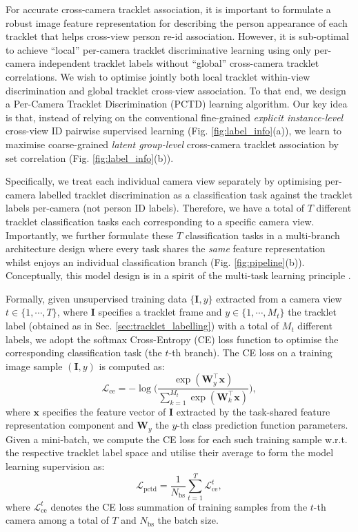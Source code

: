 \documentclass[runningheads]{llncs}
\begin{document}
For accurate cross-camera tracklet association, 
it is important to formulate a robust image feature representation for
describing the person appearance of each tracklet
that helps cross-view 
person re-id association.
However, it is sub-optimal to achieve ``local'' per-camera tracklet
discriminative learning using only per-camera independent tracklet labels
without ``global'' cross-camera tracklet correlations. We wish to
optimise jointly both local tracklet within-view discrimination and global
tracklet cross-view association.
To that end, we design a Per-Camera Tracklet Discrimination (PCTD) learning algorithm.
Our key idea is that, instead of relying on 
the conventional fine-grained {\em explicit instance-level} cross-view
ID pairwise supervised learning
(Fig. \ref{fig:label_info}(a)),
we learn to maximise coarse-grained {\em latent group-level}
cross-camera tracklet association by set correlation
(Fig. \ref{fig:label_info}(b)).

Specifically, we treat each individual camera view separately
by optimising per-camera labelled tracklet discrimination as a
classification task against the tracklet labels per-camera 
(not person ID labels). 
Therefore, we have a total of $T$ different tracklet classification tasks
each corresponding to a specific camera view.
Importantly, we further formulate these $T$ classification tasks
in a multi-branch architecture design where 
every task shares the {\em same} feature representation 
whilst enjoys an individual classification branch (Fig. \ref{fig:pipeline}(b)).
Conceptually, this model design is in a spirit of the multi-task learning principle \cite{evgeniou2004regularized,ando2005framework}.

Formally, given unsupervised training data $\{\bm{I}, y\}$ 
extracted from a camera view $t \in \{1, \cdots,T\}$,
where $\bm{I}$ specifies a tracklet frame and $y \in \{1,\cdots,M_t\}$
the tracklet label (obtained as in Sec. \ref{sec:tracklet_labelling})
with a total of $M_t$ different labels,
we adopt the softmax Cross-Entropy (CE) loss function
to optimise the corresponding classification task (the $t$-th branch).
The CE loss on a training image sample $(\bm{I}, y)$ is computed as: 
\begin{equation}
\mathcal{L}_\text{ce}=
{-}{\log}\Big(\frac{\exp({\bm{W}_{y}^{\top} {\bm x}})}
{\sum_{k=1}^{M_t}\exp({\bm{W}_{k}^{\top} {\bm x}})}\Big), 
\label{eq:CE_loss}
\end{equation}
where $\bm{x}$ specifies the feature vector of $\bm{I}$
extracted by the task-shared feature representation component 
and
$\bm{W}_{y}$ the $y$-th class prediction function parameters. 
Given a mini-batch, 
we compute the CE loss for each such training sample
w.r.t. the respective tracklet label space
and utilise their average to form the model learning supervision as:
\begin{equation}
\mathcal{L}_\text{pctd}= \frac{1}{N_\text{bs}} \sum_{t=1}^{T}
\mathcal{L}_\text{ce}^t, 
\label{eq:PCTD_loss}
\end{equation}
where $\mathcal{L}_\text{ce}^t$ denotes the CE loss summation of training samples
from the $t$-th camera among a total of $T$ and 
$N_\text{bs}$ the batch size.
\end{document}

